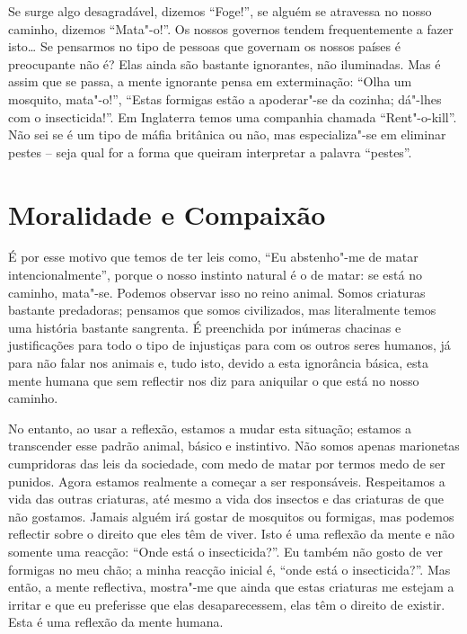 Se surge algo desagradável, dizemos “Foge!”, se alguém se atravessa no nosso
caminho, dizemos “Mata"-o!”. Os nossos governos tendem frequentemente a fazer
isto\ldots{} Se pensarmos no tipo de pessoas que governam os nossos países é
preocupante não é? Elas ainda são bastante ignorantes, não iluminadas. Mas é
assim que se passa, a mente ignorante pensa em exterminação: “Olha um mosquito,
mata"-o!”, “Estas formigas estão a apoderar"-se da cozinha; dá"-lhes com o
insecticida!”. Em Inglaterra temos uma companhia chamada “Rent"-o-kill”. Não sei
se é um tipo de máfia britânica ou não, mas especializa"-se em eliminar pestes –
seja qual for a forma que queiram interpretar a palavra “pestes”.

\section{Moralidade e Compaixão}

É por esse motivo que temos de ter leis como, “Eu abstenho"-me de matar
intencionalmente”, porque o nosso instinto natural é o de matar: se está no
caminho, mata"-se. Podemos observar isso no reino animal. Somos criaturas
bastante predadoras; pensamos que somos civilizados, mas literalmente temos uma
história bastante sangrenta. É preenchida por inúmeras chacinas e justificações
para todo o tipo de injustiças para com os outros seres humanos, já para não
falar nos animais e, tudo isto, devido a esta ignorância básica, esta mente
humana que sem reflectir nos diz para aniquilar o que está no nosso caminho.

No entanto, ao usar a reflexão, estamos a mudar esta situação; estamos a
transcender esse padrão animal, básico e instintivo. Não somos apenas marionetas
cumpridoras das leis da sociedade, com medo de matar por termos medo de ser
punidos. Agora estamos realmente a começar a ser responsáveis. Respeitamos a
vida das outras criaturas, até mesmo a vida dos insectos e das criaturas de que
não gostamos. Jamais alguém irá gostar de mosquitos ou formigas, mas podemos
reflectir sobre o direito que eles têm de viver. Isto é uma reflexão da mente e
não somente uma reacção: “Onde está o insecticida?”. Eu também não gosto de ver
formigas no meu chão; a minha reacção inicial é, “onde está o insecticida?”. Mas
então, a mente reflectiva, mostra"-me que ainda que estas criaturas me estejam a
irritar e que eu preferisse que elas desaparecessem, elas têm o direito de existir.
Esta é uma reflexão da mente humana.

